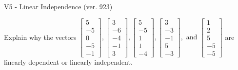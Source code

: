 \begin{exercise}
  \begin{exerciseTitle}V5 - Linear Independence (ver. 923)\end{exerciseTitle}
  \begin{exerciseStatement}
    Explain why the vectors \(\left[\begin{array}{r}
5 \\
-5 \\
0 \\
-5 \\
-1
\end{array}\right] , \left[\begin{array}{r}
3 \\
-6 \\
-4 \\
-1 \\
3
\end{array}\right] , \left[\begin{array}{r}
5 \\
-5 \\
1 \\
1 \\
-4
\end{array}\right] , \left[\begin{array}{r}
3 \\
-3 \\
-1 \\
5 \\
-3
\end{array}\right] , \text{ and } \left[\begin{array}{r}
1 \\
2 \\
5 \\
-5 \\
-5
\end{array}\right]\) are linearly dependent or linearly independent.	



\end{exerciseStatement}
\end{exercise}

